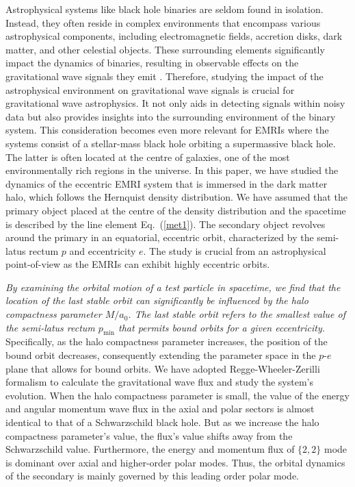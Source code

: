 \documentclass[11pt]{article}
\begin{document}
 Astrophysical systems like black hole binaries are seldom found in isolation. Instead, they often reside in complex environments that encompass various astrophysical components, including electromagnetic fields, accretion disks, dark matter, and other celestial objects. These surrounding elements significantly impact the dynamics of binaries, resulting in observable effects on the gravitational wave signals they emit \cite{Barausse:2014pra}. Therefore, studying the impact of the astrophysical environment on gravitational wave signals is crucial for gravitational wave astrophysics. It not only aids in detecting signals within noisy data but also provides insights into the surrounding environment of the binary system. This consideration becomes even more relevant for EMRIs where the systems consist of a stellar-mass black hole orbiting a supermassive black hole. The latter is often located at the centre of galaxies, one of the most environmentally rich regions in the universe.
In this paper, we have studied the dynamics of the eccentric EMRI system that is immersed in the dark matter halo, which follows the Hernquist density distribution. We have assumed that the primary object placed at the centre of the density distribution and the spacetime is described by the line element Eq.~(\ref{met1}). The secondary object revolves around the primary in an equatorial, eccentric orbit, characterized by the semi-latus rectum $p$ and eccentricity $e$. The study is crucial from an astrophysical point-of-view as the EMRIs can exhibit highly eccentric orbits.\par
\textit{By examining the orbital motion of a test particle in spacetime, we find that the location of the last stable orbit can significantly be influenced by the halo compactness parameter $M/a_0$. The last stable orbit refers to the smallest value of the semi-latus rectum $p_{\textrm{min}}$ that permits bound orbits for a given eccentricity. }
Specifically, as the halo compactness parameter increases, the position of the bound orbit decreases, consequently extending the parameter space in the $p$-$e$ plane that allows for bound orbits. We have adopted Regge-Wheeler-Zerilli formalism \cite{PhysRev.108.1063, PhysRevLett.24.737, PhysRevD.2.2141} to calculate the gravitational wave flux and study the system's evolution. When the halo compactness parameter is small, the value of the energy and angular momentum wave flux in the axial and polar sectors is almost identical to that of a Schwarzschild black hole. But as we increase the halo compactness parameter's value, the flux's value shifts away from the Schwarzschild value. Furthermore, the energy and momentum flux of $\{2,2\}$ mode is dominant over axial and higher-order polar modes. Thus, the orbital dynamics of the secondary is mainly governed by this leading order polar mode. \par
\end{document}
